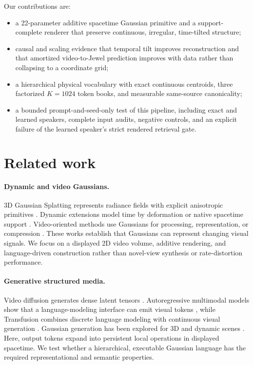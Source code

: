 \documentclass{article}
\begin{document}
Our contributions are:
\begin{itemize}
  \item a 22-parameter additive spacetime Gaussian primitive and a support-complete renderer that
  preserve continuous, irregular, time-tilted structure;
  \item causal and scaling evidence that temporal tilt improves reconstruction and that amortized
  video-to-Jewel prediction improves with data rather than collapsing to a coordinate grid;
  \item a hierarchical physical vocabulary with exact continuous centroids, three factorized
  $K=1024$ token books, and measurable same-source canonicality;
  \item a bounded prompt-and-seed-only test of this pipeline, including exact and learned
  speakers, complete input audits, negative controls, and an explicit failure of the learned
  speaker's strict rendered retrieval gate.
\end{itemize}

\section{Related work}

\paragraph{Dynamic and video Gaussians.}
3D Gaussian Splatting represents radiance fields with explicit anisotropic primitives
\cite{kerbl2023gaussians}. Dynamic extensions model time by deformation or native spacetime support
\cite{wu2024four,li2024spacetime}. Video-oriented methods use Gaussians for processing,
representation, or compression \cite{sun2024splatter,smolak2024vegas,wang2025gsvc,
lee2025gaussianvideo,shah2026garv}. These works establish that Gaussians can represent changing
visual signals. We focus on a displayed 2D video volume, additive rendering, and language-driven
construction rather than novel-view synthesis or rate-distortion performance.

\paragraph{Generative structured media.}
Video diffusion generates dense latent tensors \cite{ho2022video,blattmann2023stablevideo}.
Autoregressive multimodal models show that a language-modeling interface can emit visual tokens
\cite{chameleon2024,wang2024emu3}, while Transfusion combines discrete language modeling with
continuous visual generation \cite{zhou2025transfusion}. Gaussian generation has been explored for
3D and dynamic scenes \cite{zhang2024gaussiancube,roessle2024l3dg,lin2025diffsplat,pan2026diff4splat}.
Here, output tokens expand into persistent local operations in displayed spacetime. We test whether
a hierarchical, executable Gaussian language has the required representational and semantic
properties.
\end{document}

